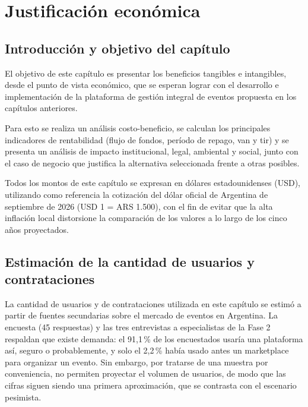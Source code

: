 
\chapter{Justificación económica}\label{cap:economica}

\section{Introducción y objetivo del capítulo}

El objetivo de este capítulo es presentar los beneficios tangibles e
intangibles, desde el punto de vista económico, que se esperan lograr con
el desarrollo e implementación de la plataforma de gestión
integral de eventos propuesta en los capítulos anteriores.

Para esto se realiza un análisis costo-beneficio, se calculan los
principales indicadores de rentabilidad (flujo de fondos, período de
repago, \gls{van} y \gls{tir}) y se presenta un análisis de impacto
institucional, legal, ambiental y social, junto con el caso de negocio
que justifica la alternativa seleccionada frente a otras posibles.

Todos los montos de este capítulo se expresan en dólares estadounidenses
(USD), utilizando como referencia la cotización del dólar oficial de
Argentina de septiembre de 2026 (USD 1 = ARS 1.500), con el fin de evitar
que la alta inflación local distorsione la comparación de los valores a
lo largo de los cinco años proyectados.

\section{Estimación de la cantidad de usuarios y contrataciones}

La cantidad de usuarios y de contrataciones utilizada en este capítulo
se estimó a partir de fuentes secundarias sobre el mercado de eventos
en Argentina. La encuesta (45 respuestas) y las tres entrevistas a
especialistas de la Fase 2 respaldan que existe demanda: el 91,1\,\% de
los encuestados usaría una plataforma así, seguro o probablemente, y
solo el 2,2\,\% había usado antes un marketplace para organizar un
evento. Sin embargo, por tratarse de una muestra por conveniencia, no
permiten proyectar el volumen de usuarios, de modo que las cifras
siguen siendo una primera aproximación, que se contrasta con el
escenario pesimista.

